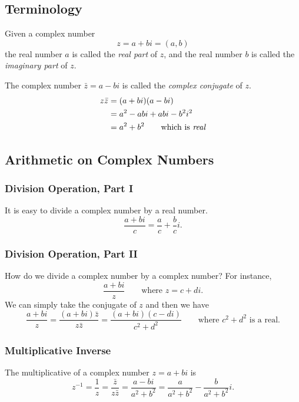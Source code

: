 \documentclass[11pt]{article}
\begin{document}
    \subsection{Terminology}
    Given a complex number \[z = a + bi = (a,b)\] the real number $a$ is called the \emph{real part} of $z$, and the real number $b$ is called the \emph{imaginary part} of $z$.

    \vspace{1em}

    The complex number \(\bar{z} = a - bi\) is called the \emph{complex conjugate} of $z$.
    \begin{align*}
        z \bar{z} &= (a+bi)(a - bi)                              \\
                  &= a^2 - abi + abi - b^2 i^2                   \\
                  &= a^2 + b^2 \qquad \text{which is \emph{real}}
    \end{align*}

    \subsection{Arithmetic on Complex Numbers}

    \subsubsection{Division Operation, Part I}
    It is easy to divide a complex number by a real number. \[\frac{a+bi}{c} = \frac{a}{c} + \frac{b}{c} i.\]

    \subsubsection{Division Operation, Part II}
    How do we divide a complex number by a complex number? For instance, \[\frac{a+bi}{z} \qquad \text{where } z = c + di.\] We can simply take the conjugate of $z$ and then we have \[\frac{a + bi}{z} = \frac{(a+bi)\bar{z}}{z \bar{z}} = \frac{(a+bi)(c-di)}{c^2 + d^2} \qquad \text{where } c^2 + d^2 \text{ is a real.}\]

    \subsubsection{Multiplicative Inverse}

    The multiplicative of a complex number \(z = a + bi\) is \[z^{-1} = \frac{1}{z} = \frac{\bar{z}}{z \bar{z}} = \frac{a - bi}{a^2 + b^2} = \frac{a}{a^2 + b^2} - \frac{b}{a^2 + b^2}i.\]
\end{document}
